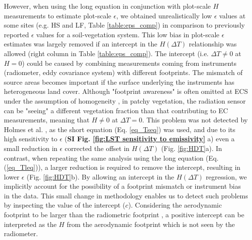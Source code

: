 \documentclass[fleqn,10pt]{wlscirep}
\begin{document}
However, when using the long equation in conjunction with plot-scale $H$ measurements to estimate plot-scale $\epsilon$, we obtained unrealistically low $\epsilon$ values at some sites (e.g. HS and LF, Table \ref{table:eps_comp}) in comparison to previously reported  $\epsilon$ values %
for a soil-vegetation system\cite{sugita_optimal_1996-1,snyder1998classification}. This low bias in plot-scale $\epsilon$ estimates was largely removed if an intercept in the $H(\Delta T)$ relationship was allowed (right column in Table \ref{table:eps_comp}). 
The intercept (i.e. $\Delta T \ne 0$ at $H=0$) could be caused by combining measurements coming from instruments (radiometer, eddy covariance system) with different footprints\cite{marcolla2018geometry}. %
The mismatch of  source areas becomes important if the surface underlying the instruments  has heterogeneous land cover. %
 Although "footprint awareness" is often omitted at ECS under the assumption of ho­mogeneity \cite{chu2021representativeness}, in patchy vegetation, the radiation sensor can be "seeing" a different vegetation fraction than that contributing to EC measurements, meaning that $H\not= 0$ at $\Delta T=0$. This problem was not detected by Holmes et al. \cite{holmes_land_2009-1}, as the short equation (Eq. \ref{eq_Tseq}) was used, and due to its high sensitivity to $\epsilon$ (\textbf{SI Fig. \ref{fig:LST sensitivity to emissivity}} a) even a small reduction in $\epsilon$ corrected the offset in $H(\Delta T)$ (Fig. \ref{fig:HDT}a). In contrast, when repeating the same analysis using the long equation (Eq. (\ref{eq_Tleq})), a larger reduction is required to remove the intercept, resulting in lower $\epsilon$ (Fig. \ref{fig:HDT}b). By allowing an intercept in the $H(\Delta T)$ regression, we implicitly account for the possibility of a footprint mismatch or instrument bias in the data. This small change in methodology enables us to detect such problems by inspecting the value of the intercept ($c$). Considering  the aerodynamic footprint to be larger than the radiometric footprint \cite{marcolla2018geometry,chu2021representativeness}, a positive intercept can be interpreted as the $H$ from the aerodynamic footprint which is not seen by the radiometer.
\end{document}
